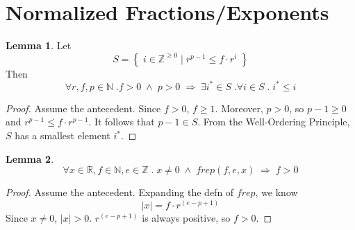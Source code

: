 \documentclass{article}
\begin{document}
\theoremstyle{definition}
\newtheorem{thm}{Theorem}[section]
\newtheorem{lem}[thm]{Lemma}

\section{Normalized Fractions/Exponents}

\begin{lem}
\label{pow}
Let
\begin{equation*}
S = \left \{ \; i \in \mathbb{Z}^{\geq 0} \; | \; r^{p - 1} \leq f \cdot r^i 
\; \right \}
\end{equation*}
Then
\begin{equation*}
\forall r, f, p \in \mathbb{N} \; . f > 0 \; \wedge \; p > 0 \; 
\Longrightarrow \; \exists i^* \in S \; . \forall i \in S \; . \; i^* \leq i
\end{equation*}
\begin{proof} Assume the antecedent. Since $f > 0$, $f \geq 1$. Moreover, 
$p > 0$, so $p - 1 \geq 0$ and $r^{p - 1} \leq f \cdot r^{p - 1}$. It follows
that $p - 1 \in S$. From the Well-Ordering Principle, $S$ has a smallest
element $i^*$. 
\end{proof}
\end{lem}

\begin{lem}
\label{posfrac}
\begin{equation*}
\forall x \in \mathbb{R}, f \in \mathbb{N}, e \in \mathbb{Z} \; . \; 
x \neq 0 \; \wedge \; frep(f,e,x) \; \Longrightarrow \; f > 0
\end{equation*}
\begin{proof} Assume the antecedent. Expanding the defn of $frep$, we know
\begin{equation*}
|x| = f \cdot r^{(e - p + 1)}
\end{equation*}
Since $x \neq 0$, $|x| > 0$. $r^{(e - p + 1)}$ is always positive, so $f > 0$.
\end{proof}
\end{lem}
\end{document}
